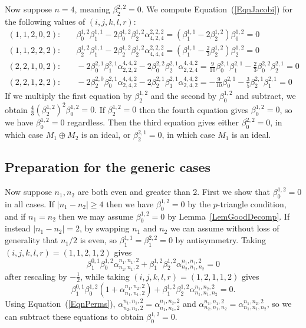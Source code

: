 \documentclass[11pt,a4paper,reqno]{amsart}
\theoremstyle{definition}
\numberwithin{equation}{section}
\begin{document}
Now suppose $n=4$, meaning $\beta^{2,2}_2=0$. We compute Equation~(\ref{EqnJacobi}) for the following values of $(i,j,k,l,r)$:
\begin{align*}
(1,1,2,0,2):&\quad\beta^{1,2}_0\beta^{1,1}_1-2\beta^{1,2}_0\beta^{1,2}_2\alpha^{2,2,2}_{4,2,4}=\left(\beta^{1,1}_1-2\beta^{1,2}_2\right)\beta^{1,2}_0=0\\
(1,1,2,2,2):&\quad\beta^{1,2}_2\beta^{1,1}_1-2\beta^{1,2}_2\beta^{1,2}_2\alpha^{2,2,2}_{4,4,4}=\left(\beta^{1,1}_1-\frac23\beta^{1,2}_2\right)\beta^{1,2}_2=0\\
(2,2,1,0,2):&\quad-2\beta^{2,1}_0\beta^{2,1}_1\alpha^{4,4,2}_{2,2,2}-2\beta^{2,2}_0\beta^{2,1}_2\alpha^{4,4,2}_{2,2,4}=\frac9{10}\beta^{2,1}_0\beta^{2,1}_1-\frac23\beta^{2,2}_0\beta^{2,1}_2=0\\
(2,2,1,2,2):&\quad-2\beta^{2,0}_2\beta^{2,1}_0\alpha^{4,4,2}_{2,4,2}-2\beta^{2,1}_2\beta^{2,1}_1\alpha^{4,4,2}_{2,4,2}=-\frac9{10}\beta^{2,1}_0-\frac35\beta^{2,1}_2\beta^{2,1}_1=0
\end{align*}
If we multiply the first equation by $\beta^{1,2}_2$ and the second by $\beta^{1,2}_0$ and subtract, we obtain $\frac43(\beta^{1,2}_2)^2\beta^{1,2}_0=0$. If $\beta^{1,2}_2=0$ then the fourth equation gives $\beta^{1,2}_0=0$, so we have $\beta^{1,2}_0=0$ regardless. Then the third equation gives either $\beta^{2,2}_0=0$, in which case $M_1\oplus M_2$ is an ideal, or $\beta^{2,1}_2=0$, in which case $M_1$ is an ideal.

\subsection{Preparation for the generic cases}\label{SecPreparation} Now suppose $n_1,n_2$ are both even and greater than 2. First we show that $\beta^{1,2}_0=0$ in all cases. If $|n_1-n_2|\geq4$ then we have $\beta^{1,2}_0=0$ by the $p$-triangle condition, and if $n_1=n_2$ then we may assume $\beta^{1,2}_0=0$ by Lemma~\ref{LemGoodDecomp}. If instead $|n_1-n_2|=2$, by swapping $n_1$ and $n_2$ we can assume without loss of generality that $n_1/2$ is even, so $\beta^{1,1}_1=\beta^{2,2}_1=0$ by antisymmetry. Taking $(i,j,k,l,r)=(1,1,2,1,2)$ gives
\[\beta^{0,1}_1\beta^{1,2}_0\alpha^{n_1,n_1,2}_{n_2,n_1,2}+\beta^{1,2}_1\beta^{1,2}_2\alpha^{n_1,n_1,2}_{n_2,n_1,n_2}=0\]
after rescaling by $-\frac12$, while taking $(i,j,k,l,r)=(1,2,1,1,2)$ gives
\[\beta^{0,1}_1\beta^{1,2}_0\left(1+\alpha^{n_1,n_2,2}_{n_1,n_1,2}\right)+\beta^{1,2}_1\beta^{1,2}_2\alpha^{n_1,n_2,2}_{n_1,n_1,n_2}=0.\]
Using Equation~(\ref{EqnPerms}), $\alpha^{n_1,n_1,2}_{n_2,n_1,2}=\alpha^{n_1,n_2,2}_{n_1,n_1,2}$ and $\alpha^{n_1,n_1,2}_{n_2,n_1,n_2}=\alpha^{n_1,n_2,2}_{n_1,n_1,n_2}$, so we can subtract these equations to obtain $\beta^{1,2}_0=0$.
\end{document}
